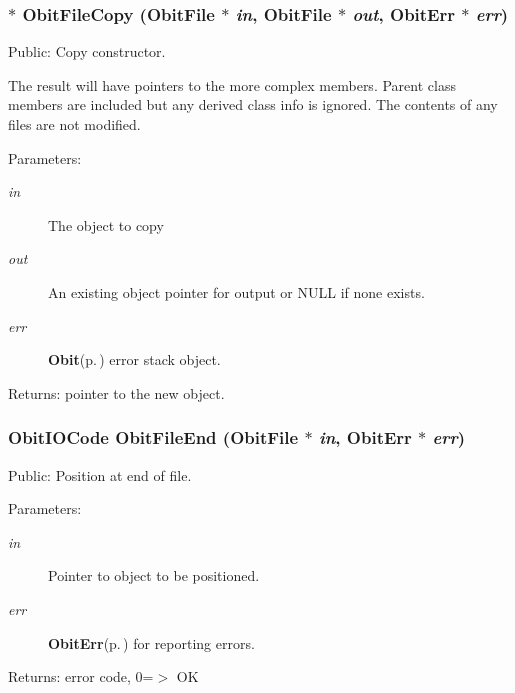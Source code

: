 \subsubsection{$\ast$ Obit\-File\-Copy ({\bf Obit\-File} $\ast$ {\em in}, {\bf Obit\-File} $\ast$ {\em out}, {\bf Obit\-Err} $\ast$ {\em err})}\label{ObitFile_8c_a11}


Public: Copy constructor. 

The result will have pointers to the more complex members. Parent class members are included but any derived class info is ignored. The contents of any files are not modified. \begin{Desc}
\item[Parameters:]
\begin{description}
\item[{\em in}]The object to copy \item[{\em out}]An existing object pointer for output or NULL if none exists. \item[{\em err}]{\bf Obit}{\rm (p.\,\pageref{structObit})} error stack object. \end{description}
\end{Desc}
\begin{Desc}
\item[Returns:]pointer to the new object. \end{Desc}
\subsubsection{\setlength{\rightskip}{0pt plus 5cm}Obit\-IOCode Obit\-File\-End ({\bf Obit\-File} $\ast$ {\em in}, {\bf Obit\-Err} $\ast$ {\em err})}\label{ObitFile_8c_a18}


Public: Position at end of file. 

\begin{Desc}
\item[Parameters:]
\begin{description}
\item[{\em in}]Pointer to object to be positioned. \item[{\em err}]{\bf Obit\-Err}{\rm (p.\,\pageref{structObitErr})} for reporting errors. \end{description}
\end{Desc}
\begin{Desc}
\item[Returns:]error code, 0=$>$ OK \end{Desc}

